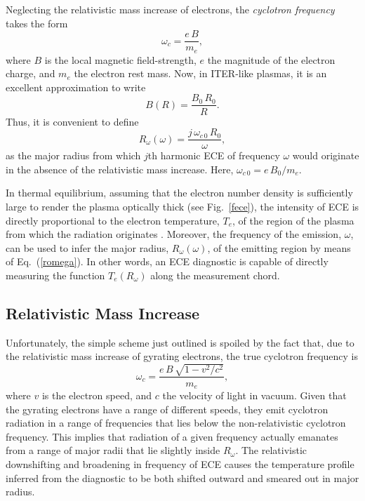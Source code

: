 \documentclass{iopjournal}
\begin{document}
{Neglecting the relativistic mass increase of electrons, the {\em cyclotron frequency}\/ takes the form \cite{plasma}
\begin{equation}
\omega_c = \frac{e\,B}{m_e},
\end{equation}
where $B$ is the local magnetic field-strength, $e$ the magnitude of the electron charge, and $m_e$ the electron rest mass.
Now, in ITER-like plasmas, it is an excellent approximation to write
\begin{equation}
B(R)= \frac{B_0\,R_0}{R}.
\end{equation}
Thus, it is convenient to define
\begin{equation}\label{romega}
R_\omega(\omega) = \frac{j\,\omega_{c\,0}\,R_0}{\omega},
\end{equation}
as the major radius from which $j$th harmonic ECE of frequency $\omega$ would originate in the absence of the relativistic mass increase. Here, $\omega_{c\,0}=e\,B_0/m_e$. 

In thermal equilibrium, assuming that the electron number density is sufficiently large to render the plasma optically thick (see Fig.~\ref{fece}), the intensity of ECE  is directly proportional to the electron temperature, $T_e$,  of the region of the plasma from which the radiation originates \cite{bornatici}. 
 Moreover, the frequency of the emission, $\omega$, can be used to infer the major radius, $R_\omega(\omega)$,  of the
emitting region by means of Eq.~(\ref{romega}). In other words, an ECE diagnostic is capable of directly measuring the function $T_e(R_\omega)$ along the measurement chord.

\subsection{Relativistic Mass Increase}
 Unfortunately, the simple scheme just outlined is spoiled by the
fact that, due to the relativistic mass increase of gyrating electrons,  the true cyclotron frequency is
\begin{equation}
\omega_c = \frac{e\,B\,\sqrt{1-v^2/c^2}}{m_e},
\end{equation}
where $v$ is the electron speed, and $c$ the velocity of light in vacuum. Given that the gyrating electrons have a range of different speeds, they emit
cyclotron radiation in a range of frequencies that lies below the non-relativistic cyclotron frequency. This implies that radiation of a given frequency
actually emanates from a range of major radii that lie slightly inside $R_\omega$. The relativistic downshifting and broadening
in frequency of ECE  causes the temperature profile inferred from the diagnostic to be both shifted outward and smeared out in major radius. 

}
\end{document}

